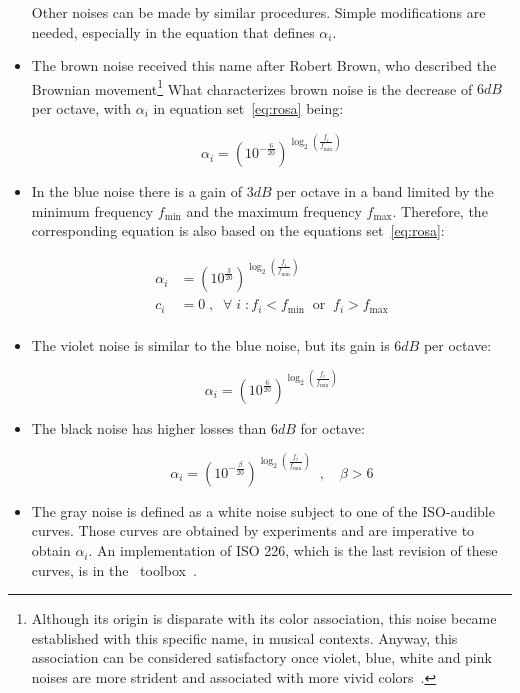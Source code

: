\begin{itemize}
Other noises can be made by similar procedures. Simple modifications are needed, especially in the equation that defines $\alpha_i$.

  \item The brown noise received this name after Robert Brown, who described the Brownian movement\footnote{Although its origin is disparate with its color association, this noise became established with this specific name, in musical contexts. Anyway, this association can be considered satisfactory once violet, blue, white and pink noises are more strident and associated with more vivid colors~\cite{Cook,guillaume}.} What characterizes brown noise is the decrease of $6dB$ per octave, with $\alpha_i$ in equation set~\ref{eq:rosa} being:

\begin{equation}\label{eq:marrom}
 \alpha_i=(10^{-\frac{6}{20}})^{\log _2 \left( \frac{f_i}{f_{\text{min}}} \right )}
\end{equation}

 \item In the blue noise there is a gain of $3dB$ per octave in a band limited by the minimum frequency $f_{\text{min}}$ and the maximum frequency $f_{\text{max}}$. Therefore, the corresponding equation is also based on the equations set~\ref{eq:rosa}:

\begin{equation}\label{eq:azul}
 \begin{split}
 \alpha_i & = (10^{\frac{3}{20}})^{\log _2 \left ( \frac{f_i}{f_{\text{min}}} \right )} \\
 c_i & =0\;,\;\; \forall \; i \; : f_i<f_{\text{min}} \;\; \text{or} \;\; f_i>f_{\text{max}} \\
 \end{split}
\end{equation}

 \item The violet noise is similar to the blue noise, but its gain is $6dB$ per octave:

\begin{equation}\label{eq:violeta}
 \alpha_i = (10^{\frac{6}{20}})^{\log _2 \left ( \frac{f_i}{f_{\text{min}}} \right )}
\end{equation}

 \item The black noise has higher losses than $6dB$ for octave:

\begin{equation}\label{eq:preto}
 \alpha_i=(10^{-\frac{\beta}{20}})^{\log _2 \left( \frac{f_i}{f_{\text{min}}} \right )}\;\;, \quad \beta > 6
\end{equation}

 \item The gray noise is defined as a white noise subject to one of the ISO-audible curves. Those curves are obtained by experiments and are imperative to obtain $\alpha_i$. An implementation of ISO 226, which is the last revision of these curves, is in the \massa\ toolbox~\cite{MASSA}.
\end{itemize}

